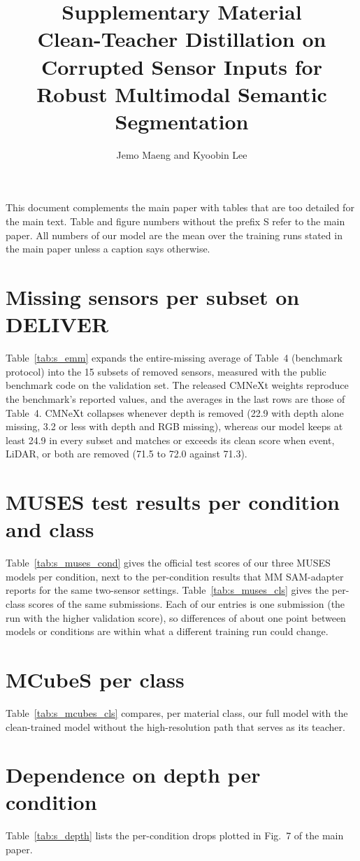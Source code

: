 \documentclass[10pt]{article}
\title{Supplementary Material\\[4pt]\large Clean-Teacher Distillation on Corrupted Sensor Inputs for Robust Multimodal Semantic Segmentation}
\author{Jemo Maeng and Kyoobin Lee}
\date{}
\begin{document}
\maketitle

This document complements the main paper with tables that are too detailed for the main text. Table and figure numbers without the prefix S refer to the main paper. All numbers of our model are the mean over the training runs stated in the main paper unless a caption says otherwise.

\section{Missing sensors per subset on DELIVER}
Table~\ref{tab:s_emm} expands the entire-missing average of Table~4 (benchmark protocol) into the 15 subsets of removed sensors, measured with the public benchmark code on the validation set. The released CMNeXt weights reproduce the benchmark's reported values, and the averages in the last rows are those of Table~4. CMNeXt collapses whenever depth is removed (22.9 with depth alone missing, 3.2 or less with depth and RGB missing), whereas our model keeps at least 24.9 in every subset and matches or exceeds its clean score when event, LiDAR, or both are removed (71.5 to 72.0 against 71.3).

\section{MUSES test results per condition and class}
Table~\ref{tab:s_muses_cond} gives the official test scores of our three MUSES models per condition, next to the per-condition results that MM SAM-adapter reports for the same two-sensor settings. Table~\ref{tab:s_muses_cls} gives the per-class scores of the same submissions. Each of our entries is one submission (the run with the higher validation score), so differences of about one point between models or conditions are within what a different training run could change.

\section{MCubeS per class}
Table~\ref{tab:s_mcubes_cls} compares, per material class, our full model with the clean-trained model without the high-resolution path that serves as its teacher.

\section{Dependence on depth per condition}
Table~\ref{tab:s_depth} lists the per-condition drops plotted in Fig.~7 of the main paper.
\end{document}
